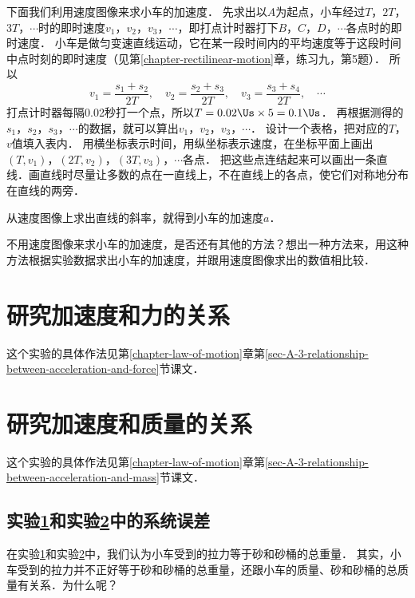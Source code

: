 下面我们利用速度图像来求小车的加速度．
先求出以$A$为起点，小车经过$T $，$ 2T $，$ 3T $，$ \cdots$时的即时速度$v_1 $，$ v_2 $，$ v_3 $，$ \cdots$，即打点计时器打下$B $，$ C $，$ D $，$ \cdots$各点时的即时速度．
小车是做匀变速直线运动，它在某一段时间内的平均速度等于这段时间中点时刻的即时速度（见第\ref{chapter-rectilinear-motion}章，练习九，第5题）．
所以
\[v_1=\frac{s_1+s_2}{2T}, \quad  v_2=\frac{s_2+s_3}{2T},  \quad v_3=\frac{s_3+s_4}{2T},  \quad  \cdots\]
打点计时器每隔0.02秒打一个点，所以$T=0.02 \Us \times 5=0.1\Us$．
再根据测得的$s_1 $，$ s_2 $，$ s_3 $，$ \cdots$的数据，就可以算出$v_1 $，$ v_2 $，$ v_3 $，$ \cdots$．
设计一个表格，把对应的$T $，$ v$值填入表内．
用横坐标表示时间，用纵坐标表示速度，在坐标平面上画出$(T,v_1) $，$ (2T,v_2) $，$ (3T,v_3) $，$ \cdots$各点．
把这些点连结起来可以画出一条直线．画直线时尽量让多数的点在一直线上，不在直线上的各点，使它们对称地分布在直线的两旁．

从速度图像上求出直线的斜率，就得到小车的加速度$a$．

不用速度图像来求小车的加速度，是否还有其他的方法？想出一种方法来，用这种方法根据实验数据求出小车的加速度，并跟用速度图像求出的数值相比较．

\section{研究加速度和力的关系}\label{sec-A-app-1-8-studying-the-relationship-between-acceleration-and-force}
这个实验的具体作法见第\ref{chapter-law-of-motion}章第\ref{sec-A-3-relationship-between-acceleration-and-force}节课文．

\section{研究加速度和质量的关系}\label{sec-A-app-1-9-studying-the-relationship-between-acceleration-and-mass}
这个实验的具体作法见第\ref{chapter-law-of-motion}章第\ref{sec-A-3-relationship-between-acceleration-and-mass}节课文．

\subsection*{实验\ref{sec-A-app-1-8-studying-the-relationship-between-acceleration-and-force}和实验\ref{sec-A-app-1-9-studying-the-relationship-between-acceleration-and-mass}中的系统误差}
在实验\ref{sec-A-app-1-8-studying-the-relationship-between-acceleration-and-force}和实验\ref{sec-A-app-1-9-studying-the-relationship-between-acceleration-and-mass}中，我们认为小车受到的拉力等于砂和砂桶的总重量．
其实，小车受到的拉力并不正好等于砂和砂桶的总重量，还跟小车的质量、砂和砂桶的总质量有关系．为什么呢？

